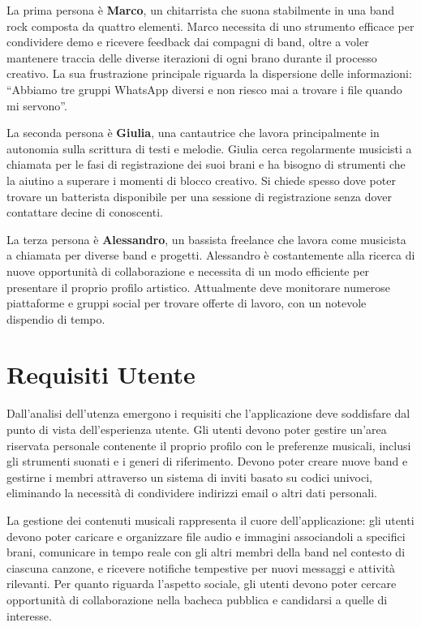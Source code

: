 \documentclass{report}
\begin{document}
La prima persona è \textbf{Marco}, un chitarrista che suona stabilmente in una band rock composta da quattro elementi. Marco necessita di uno strumento efficace per condividere demo e ricevere feedback dai compagni di band, oltre a voler mantenere traccia delle diverse iterazioni di ogni brano durante il processo creativo. La sua frustrazione principale riguarda la dispersione delle informazioni: ``Abbiamo tre gruppi WhatsApp diversi e non riesco mai a trovare i file quando mi servono''.

La seconda persona è \textbf{Giulia}, una cantautrice che lavora principalmente in autonomia sulla scrittura di testi e melodie. Giulia cerca regolarmente musicisti a chiamata per le fasi di registrazione dei suoi brani e ha bisogno di strumenti che la aiutino a superare i momenti di blocco creativo. Si chiede spesso dove poter trovare un batterista disponibile per una sessione di registrazione senza dover contattare decine di conoscenti.

La terza persona è \textbf{Alessandro}, un bassista freelance che lavora come musicista a chiamata per diverse band e progetti. Alessandro è costantemente alla ricerca di nuove opportunità di collaborazione e necessita di un modo efficiente per presentare il proprio profilo artistico. Attualmente deve monitorare numerose piattaforme e gruppi social per trovare offerte di lavoro, con un notevole dispendio di tempo.

\section{Requisiti Utente}

Dall'analisi dell'utenza emergono i requisiti che l'applicazione deve soddisfare dal punto di vista dell'esperienza utente. Gli utenti devono poter gestire un'area riservata personale contenente il proprio profilo con le preferenze musicali, inclusi gli strumenti suonati e i generi di riferimento. Devono poter creare nuove band e gestirne i membri attraverso un sistema di inviti basato su codici univoci, eliminando la necessità di condividere indirizzi email o altri dati personali.

La gestione dei contenuti musicali rappresenta il cuore dell'applicazione: gli utenti devono poter caricare e organizzare file audio e immagini associandoli a specifici brani, comunicare in tempo reale con gli altri membri della band nel contesto di ciascuna canzone, e ricevere notifiche tempestive per nuovi messaggi e attività rilevanti. Per quanto riguarda l'aspetto sociale, gli utenti devono poter cercare opportunità di collaborazione nella bacheca pubblica e candidarsi a quelle di interesse.
\end{document}
